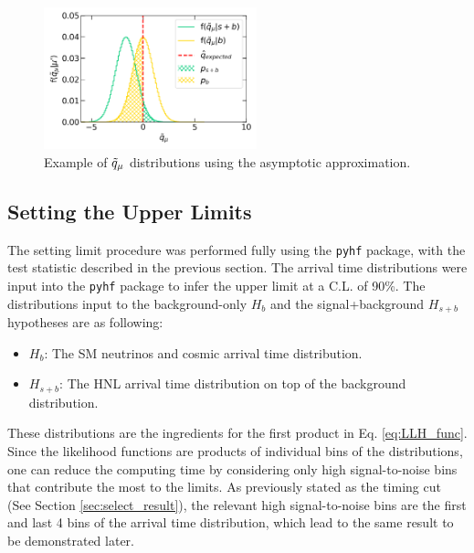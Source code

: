 \begin{figure}[hb!] 
\centering    
\includegraphics[width=0.55\textwidth]{asymtotic}
\caption[Distribution of Test Statistics Acquired from Asymptotic Approximation]{Example of $\Tilde{q}_\mu$ distributions using the asymptotic approximation.}
\label{fig:stat_asymptotic}
\end{figure}

\subsection{Setting the Upper Limits}
\label{sec:set_limits}

The setting limit procedure was performed fully using the \texttt{pyhf} package, with the test statistic described in the previous section.
The arrival time distributions were input into the \texttt{pyhf} package to infer the upper limit at a C.L. of 90\%.
The distributions input to the background-only $H_{b}$ and the signal+background $H_{s+b}$ hypotheses are as following:
\begin{itemize}
    \item $H_b$: The SM neutrinos and cosmic arrival time distribution.
    \item $H_{s+b}$: The HNL arrival time distribution on top of the background distribution. 
\end{itemize}

These distributions are the ingredients for the first product in Eq. \ref{eq:LLH_func}.
Since the likelihood functions are products of individual bins of the distributions, one can reduce the computing time by considering only high signal-to-noise bins that contribute the most to the limits. 
As previously stated as the timing cut (See Section \ref{sec:select_result}), the relevant high signal-to-noise bins are the first and last 4 bins of the arrival time distribution, which lead to the same result to be demonstrated later.

